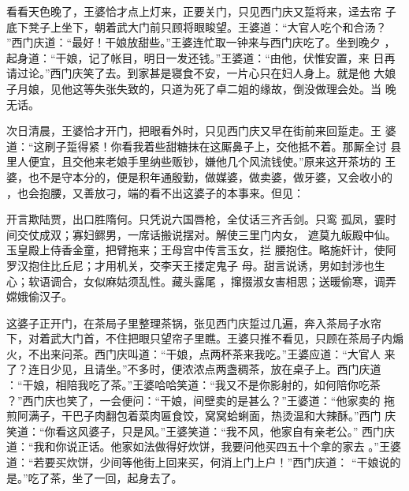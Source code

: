 看看天色晚了，王婆恰才点上灯来，正要关门，只见西门庆又踅将来，迳去帘
子底下凳子上坐下，朝着武大门前只顾将眼睃望。王婆道：“大官人吃个和合汤？
”西门庆道：“最好！干娘放甜些。”王婆连忙取一钟来与西门庆吃了。坐到晚夕
，起身道：“干娘，记了帐目，明日一发还钱。”王婆道：“由他，伏惟安置，来
日再请过论。”西门庆笑了去。到家甚是寝食不安，一片心只在妇人身上。就是他
大娘子月娘，见他这等失张失致的，只道为死了卓二姐的缘故，倒没做理会处。当
晚无话。

次日清晨，王婆恰才开门，把眼看外时，只见西门庆又早在街前来回踅走。王
婆道：“这刷子踅得紧！你看我着些甜糖抹在这厮鼻子上，交他抵不着。那厮全讨
县里人便宜，且交他来老娘手里纳些贩钞，嫌他几个风流钱使。”原来这开茶坊的
王婆，也不是守本分的，便是积年通殷勤，做媒婆，做卖婆，做牙婆，又会收小的
，也会抱腰，又善放刁，端的看不出这婆子的本事来。但见：

开言欺陆贾，出口胜隋何。只凭说六国唇枪，全仗话三齐舌剑。只鸾
孤凤，霎时间交仗成双；寡妇鳏男，一席话搬说摆对。解使三里门内女，
遮莫九皈殿中仙。玉皇殿上侍香金童，把臂拖来；王母宫中传言玉女，拦
腰抱住。略施奸计，使阿罗汉抱住比丘尼；才用机关，交李天王搂定鬼子
母。甜言说诱，男如封涉也生心；软语调合，女似麻姑须乱性。藏头露尾
，撺掇淑女害相思；送暖偷寒，调弄嫦娥偷汉子。

这婆子正开门，在茶局子里整理茶锅，张见西门庆踅过几遍，奔入茶局子水帘
下，对着武大门首，不住把眼只望帘子里瞧。王婆只推不看见，只顾在茶局子内煽
火，不出来问茶。西门庆叫道：“干娘，点两杯茶来我吃。”王婆应道：“大官人
来了？连日少见，且请坐。”不多时，便浓浓点两盏稠茶，放在桌子上。西门庆道
：“干娘，相陪我吃了茶。”王婆哈哈笑道：“我又不是你影射的，如何陪你吃茶
？”西门庆也笑了，一会便问：“干娘，间壁卖的是甚么？”王婆道：“他家卖的
拖煎阿满子，干巴子肉翻包着菜肉匾食饺，窝窝蛤蜊面，热烫温和大辣酥。”西门
庆笑道：“你看这风婆子，只是风。”王婆笑道：“我不风，他家自有亲老公。”
西门庆道：“我和你说正话。他家如法做得好炊饼，我要问他买四五十个拿的家去
。”王婆道：“若要买炊饼，少间等他街上回来买，何消上门上户！”西门庆道：
“干娘说的是。”吃了茶，坐了一回，起身去了。

